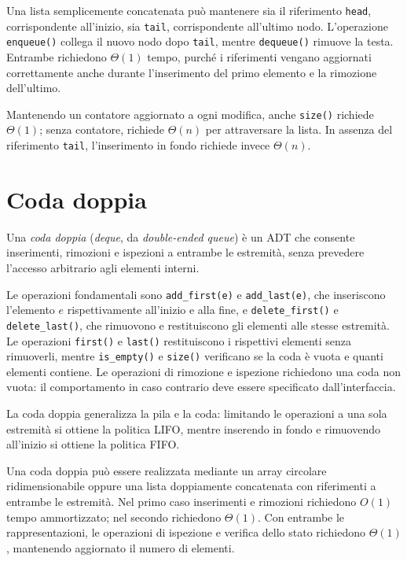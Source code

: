 Una lista semplicemente concatenata può mantenere sia il
riferimento \texttt{head}, corrispondente all'inizio, sia
\texttt{tail}, corrispondente all'ultimo nodo.
L'operazione \texttt{enqueue()} collega il nuovo nodo dopo
\texttt{tail}, mentre \texttt{dequeue()} rimuove la testa.
Entrambe richiedono \(\Theta(1)\) tempo, purché i riferimenti
vengano aggiornati correttamente anche durante l'inserimento
del primo elemento e la rimozione dell'ultimo.

Mantenendo un contatore aggiornato a ogni modifica, anche
\texttt{size()} richiede \(\Theta(1)\); senza contatore,
richiede \(\Theta(n)\) per attraversare la lista. In assenza
del riferimento \texttt{tail}, l'inserimento in fondo richiede
invece \(\Theta(n)\).

\section{Coda doppia}
\label{sec:fi-adt-deque}

\begin{definition}
\label{def:fi-adt-deque}
Una \emph{coda doppia} (\emph{deque}, da \emph{double-ended queue})
è un ADT che consente inserimenti, rimozioni e ispezioni a entrambe
le estremità, senza prevedere l'accesso arbitrario agli elementi
interni.
\end{definition}

Le operazioni fondamentali sono \texttt{add\_first(e)} e
\texttt{add\_last(e)}, che inseriscono l'elemento \(e\)
rispettivamente all'inizio e alla fine, e
\texttt{delete\_first()} e \texttt{delete\_last()},
che rimuovono e restituiscono gli elementi alle stesse estremità.
Le operazioni \texttt{first()} e \texttt{last()} restituiscono
i rispettivi elementi senza rimuoverli, mentre
\texttt{is\_empty()} e \texttt{size()} verificano se la coda
è vuota e quanti elementi contiene. Le operazioni di rimozione
e ispezione richiedono una coda non vuota: il comportamento
in caso contrario deve essere specificato dall'interfaccia.

La coda doppia generalizza la pila e la coda: limitando le
operazioni a una sola estremità si ottiene la politica LIFO,
mentre inserendo in fondo e rimuovendo all'inizio si ottiene
la politica FIFO.

Una coda doppia può essere realizzata mediante un array circolare
ridimensionabile oppure una lista doppiamente concatenata con
riferimenti a entrambe le estremità. Nel primo caso inserimenti
e rimozioni richiedono \(O(1)\) tempo ammortizzato; nel secondo
richiedono \(\Theta(1)\). Con entrambe le rappresentazioni,
le operazioni di ispezione e verifica dello stato richiedono
\(\Theta(1)\), mantenendo aggiornato il numero di elementi.

